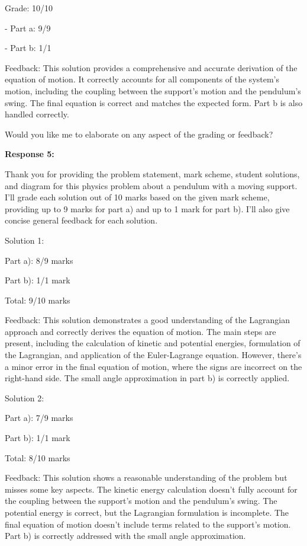 \documentclass[a4paper,11pt]{article}
\begin{document}
Grade: 10/10

- Part a: 9/9

- Part b: 1/1

Feedback: This solution provides a comprehensive and accurate derivation of the equation of motion. It correctly accounts for all components of the system's motion, including the coupling between the support's motion and the pendulum's swing. The final equation is correct and matches the expected form. Part b is also handled correctly.

Would you like me to elaborate on any aspect of the grading or feedback?

\bigskip
\textbf{Response 5:}

Thank you for providing the problem statement, mark scheme, student solutions, and diagram for this physics problem about a pendulum with a moving support. I'll grade each solution out of 10 marks based on the given mark scheme, providing up to 9 marks for part a) and up to 1 mark for part b). I'll also give concise general feedback for each solution.

Solution 1:

Part a): 8/9 marks

Part b): 1/1 mark

Total: 9/10 marks

Feedback: This solution demonstrates a good understanding of the Lagrangian approach and correctly derives the equation of motion. The main steps are present, including the calculation of kinetic and potential energies, formulation of the Lagrangian, and application of the Euler-Lagrange equation. However, there's a minor error in the final equation of motion, where the signs are incorrect on the right-hand side. The small angle approximation in part b) is correctly applied.

Solution 2:

Part a): 7/9 marks

Part b): 1/1 mark

Total: 8/10 marks

Feedback: This solution shows a reasonable understanding of the problem but misses some key aspects. The kinetic energy calculation doesn't fully account for the coupling between the support's motion and the pendulum's swing. The potential energy is correct, but the Lagrangian formulation is incomplete. The final equation of motion doesn't include terms related to the support's motion. Part b) is correctly addressed with the small angle approximation.
\end{document}

